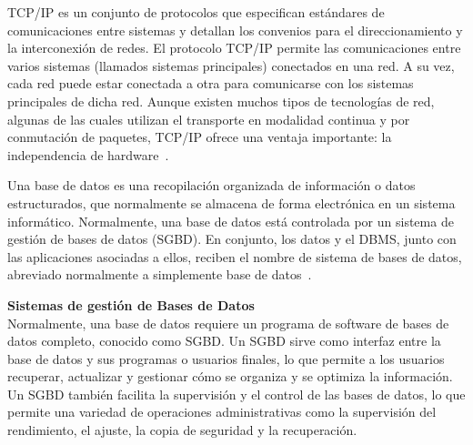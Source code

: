 TCP/IP es un conjunto de protocolos que especifican estándares de comunicaciones entre sistemas y detallan los convenios para el direccionamiento y la interconexión de redes. El protocolo TCP/IP permite las comunicaciones entre varios sistemas (llamados sistemas principales) conectados en una red. A su vez, cada red puede estar conectada a otra para comunicarse con los sistemas principales de dicha red. Aunque existen muchos tipos de tecnologías de red, algunas de las cuales utilizan el transporte en modalidad continua y por conmutación de paquetes, TCP/IP ofrece una ventaja importante: la independencia de hardware~\cite{protocolo-tcp-ip}.

Una base de datos es una recopilación organizada de información o datos estructurados, que normalmente se almacena de forma electrónica en un sistema informático. Normalmente, una base de datos está controlada por un sistema de gestión de bases de datos (SGBD). En conjunto, los datos y el DBMS, junto con las aplicaciones asociadas a ellos, reciben el nombre de sistema de bases de datos, abreviado normalmente a simplemente base de datos~\cite{Quéesuna68}.

\textbf{Sistemas de gestión de Bases de Datos} \\
Normalmente, una base de datos requiere un programa de software de bases de datos completo, conocido como SGBD. Un SGBD sirve como interfaz entre la base de datos y sus programas o usuarios finales, lo que permite a los  usuarios recuperar, actualizar y gestionar cómo se organiza y se optimiza la información. Un SGBD también facilita la supervisión y el control de las bases de datos, lo que permite una variedad de operaciones administrativas como la supervisión del rendimiento, el ajuste, la copia de seguridad y la recuperación.~\cite{Quéesuna68}

